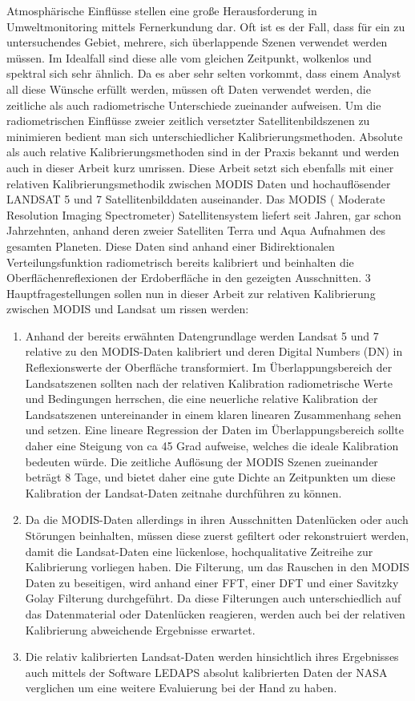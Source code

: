\documentclass[11pt]{report}
\begin{document}
Atmosphärische Einflüsse stellen eine große Herausforderung in Umweltmonitoring mittels Fernerkundung dar.  Oft ist es der Fall, dass für ein zu untersuchendes Gebiet, mehrere, sich überlappende Szenen verwendet werden müssen. Im Idealfall sind diese alle vom gleichen Zeitpunkt, wolkenlos und spektral sich sehr ähnlich. Da es aber sehr selten vorkommt, dass einem Analyst all diese Wünsche erfüllt werden, müssen oft Daten verwendet werden, die zeitliche als auch radiometrische Unterschiede zueinander aufweisen. Um die radiometrischen Einflüsse zweier zeitlich versetzter Satellitenbildszenen zu minimieren bedient man sich unterschiedlicher Kalibrierungsmethoden. Absolute als auch relative Kalibrierungsmethoden sind in der Praxis bekannt und werden auch in dieser Arbeit kurz umrissen. Diese Arbeit setzt sich ebenfalls mit einer relativen Kalibrierungsmethodik zwischen MODIS Daten und  hochauflösender LANDSAT 5 und 7 Satellitenbilddaten auseinander. Das MODIS ( Moderate Resolution Imaging Spectrometer) Satellitensystem liefert seit Jahren, gar schon Jahrzehnten, anhand deren zweier Satelliten Terra und Aqua Aufnahmen des gesamten Planeten. Diese Daten sind anhand einer Bidirektionalen Verteilungsfunktion radiometrisch bereits kalibriert und beinhalten die Oberflächenreflexionen der Erdoberfläche in den gezeigten Ausschnitten. 3 Hauptfragestellungen sollen nun in dieser Arbeit zur relativen Kalibrierung zwischen MODIS und Landsat um rissen werden:
\begin{enumerate}
\item Anhand der bereits erwähnten  Datengrundlage werden Landsat 5 und 7 relative zu den MODIS-Daten kalibriert und deren Digital Numbers (DN) in Reflexionswerte der Oberfläche transformiert. Im Überlappungsbereich der Landsatszenen sollten nach der relativen Kalibration radiometrische Werte und Bedingungen herrschen, die eine neuerliche relative Kalibration der Landsatszenen untereinander in einem klaren linearen Zusammenhang sehen und setzen. Eine lineare Regression der Daten im Überlappungsbereich sollte daher eine Steigung von ca 45 Grad aufweise, welches die ideale Kalibration bedeuten würde. Die zeitliche Auflösung der MODIS Szenen zueinander beträgt 8 Tage, und bietet daher eine gute Dichte an Zeitpunkten um diese Kalibration der Landsat-Daten zeitnahe durchführen zu können.

\item Da die MODIS-Daten allerdings in ihren Ausschnitten Datenlücken oder auch Störungen beinhalten, müssen diese zuerst gefiltert oder rekonstruiert werden, damit die Landsat-Daten eine lückenlose, hochqualitative Zeitreihe zur Kalibrierung vorliegen haben. Die Filterung, um das Rauschen in den MODIS Daten zu beseitigen, wird anhand einer FFT, einer DFT und einer Savitzky Golay Filterung durchgeführt. Da diese Filterungen auch unterschiedlich auf das Datenmaterial oder Datenlücken reagieren, werden auch bei der relativen Kalibrierung abweichende Ergebnisse erwartet.

\item Die relativ kalibrierten Landsat-Daten werden hinsichtlich ihres Ergebnisses auch mittels der Software LEDAPS absolut kalibrierten Daten der NASA verglichen um eine weitere Evaluierung bei der Hand zu haben. 
\end{enumerate}
\end{document}
